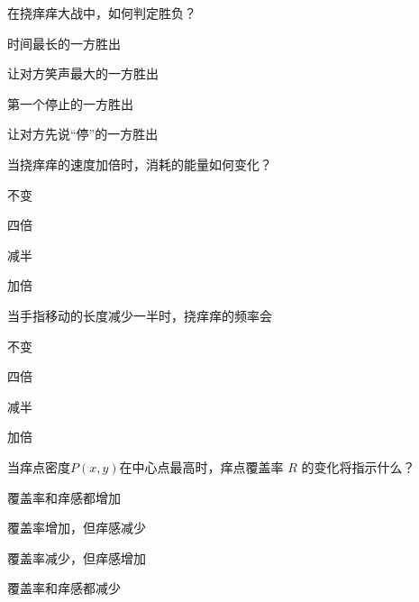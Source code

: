 \documentclass{exam-zh}
\begin{document}
\begin{question}[points = 2]
  在挠痒痒大战中，如何判定胜负？

  \begin{choices}
    \item 时间最长的一方胜出
    \item 让对方笑声最大的一方胜出
    \item 第一个停止的一方胜出
    \item 让对方先说“停”的一方胜出
  \end{choices}
\end{question}

\begin{question}[points = 2]
  当挠痒痒的速度加倍时，消耗的能量如何变化？

  \begin{choices}
    \item 不变
    \item 四倍
    \item 减半
    \item 加倍
  \end{choices}
\end{question}

\begin{question}[points = 2]
  当手指移动的长度减少一半时，挠痒痒的频率会

  \begin{choices}
    \item 不变
    \item 四倍
    \item 减半
    \item 加倍
  \end{choices}
\end{question}


\begin{question}[points = 2]
  当痒点密度$P(x,y)$在中心点最高时，痒点覆盖率 $R$ 的变化将指示什么？

  \begin{choices}
    \item 覆盖率和痒感都增加

    \item 覆盖率增加，但痒感减少
    \item 覆盖率减少，但痒感增加
    \item 覆盖率和痒感都减少
  \end{choices}
\end{question}
\end{document}
